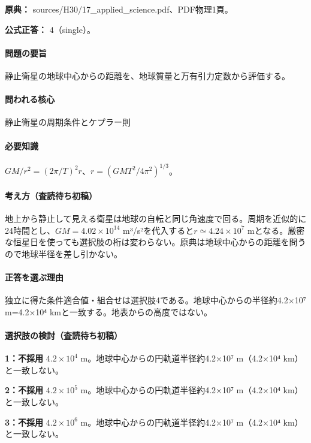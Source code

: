 \noindent\textbf{原典：} sources/H30/17\_applied\_science.pdf、PDF物理1頁。

\textbf{公式正答：} 4（single）。

\paragraph{問題の要旨} 静止衛星の地球中心からの距離を、地球質量と万有引力定数から評価する。

\paragraph{問われる核心} 静止衛星の周期条件とケプラー則

\paragraph{必要知識} \(GM/r^2=(2\pi/T)^2r\)、\(r=(GMT^2/4\pi^2)^{1/3}\)。

\paragraph{考え方（査読待ち初稿）} 地上から静止して見える衛星は地球の自転と同じ角速度で回る。周期を近似的に24時間とし、\(GM=4.02\times10^{14}\) m³/s²を代入すると\(r\simeq4.24\times10^7\) mとなる。厳密な恒星日を使っても選択肢の桁は変わらない。原典は地球中心からの距離を問うので地球半径を差し引かない。

\paragraph{正答を選ぶ理由} 独立に得た条件適合値・組合せは選択肢4である。地球中心からの半径約4.2×10⁷ m=4.2×10⁴ kmと一致する。地表からの高度ではない。

\paragraph{選択肢の検討（査読待ち初稿）}

\noindent\textbf{1：不採用} \(4.2\times10^4\) m。地球中心からの円軌道半径約4.2×10⁷ m（4.2×10⁴ km）と一致しない。\par

\noindent\textbf{2：不採用} \(4.2\times10^5\) m。地球中心からの円軌道半径約4.2×10⁷ m（4.2×10⁴ km）と一致しない。\par

\noindent\textbf{3：不採用} \(4.2\times10^6\) m。地球中心からの円軌道半径約4.2×10⁷ m（4.2×10⁴ km）と一致しない。\par

